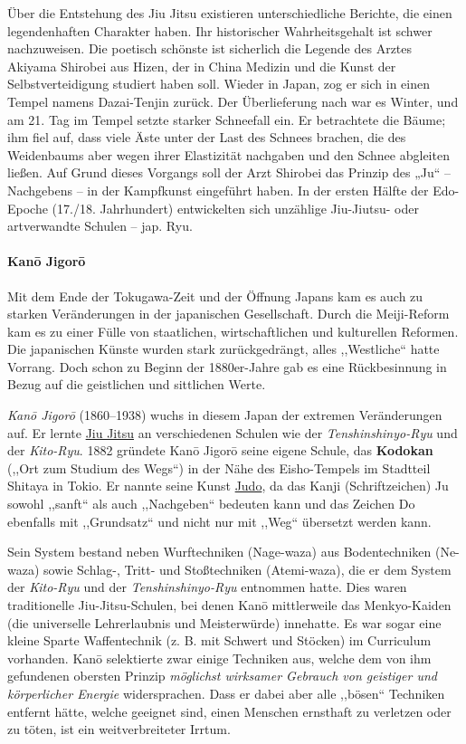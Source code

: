 \documentclass[justified, a4paper, notitlepage, captions=tableheading, nobib]{tufte-handout}
\begin{document}
Über die Entstehung des \label{orgb1f4d96}Jiu Jitsu existieren unterschiedliche Berichte, die einen legendenhaften Charakter haben. Ihr historischer Wahrheitsgehalt ist schwer nachzuweisen. Die poetisch schönste ist sicherlich die Legende des Arztes Akiyama Shirobei aus Hizen, der in China Medizin und die Kunst der Selbstverteidigung studiert haben soll. Wieder in Japan, zog er sich in einen Tempel namens Dazai-Tenjin zurück. Der Überlieferung nach war es Winter, und am 21. Tag im Tempel setzte starker Schneefall ein. Er betrachtete die Bäume; ihm fiel auf, dass viele Äste unter der Last des Schnees brachen, die des Weidenbaums aber wegen ihrer Elastizität nachgaben und den Schnee abgleiten ließen. Auf Grund dieses Vorgangs soll der Arzt Shirobei das Prinzip des „Ju“ – Nachgebens – in der Kampfkunst eingeführt haben. In der ersten Hälfte der Edo-Epoche (17./18. Jahrhundert) entwickelten sich unzählige Jiu-Jiutsu- oder artverwandte Schulen – jap. Ryu.

\paragraph{Kanō Jigorō}
\label{sec:org6c92adc}
Mit dem Ende der Tokugawa-Zeit und der Öffnung Japans kam es auch zu starken Veränderungen in der japanischen Gesellschaft. Durch die Meiji-Reform kam es zu einer Fülle von staatlichen, wirtschaftlichen und kulturellen Reformen. Die japanischen Künste wurden stark zurückgedrängt, alles ,,Westliche`` hatte Vorrang. Doch schon zu Beginn der 1880er-Jahre gab es eine Rückbesinnung in Bezug auf die geistlichen und sittlichen Werte.

\emph{Kanō Jigorō} (1860–1938) wuchs in diesem Japan der extremen Veränderungen auf. Er lernte \hyperref[orgb1f4d96]{Jiu Jitsu} an verschiedenen Schulen wie der \emph{Tenshinshinyo-Ryu} und der \emph{Kito-Ryu}. 1882 gründete Kanō Jigorō seine eigene Schule, das \textbf{Kodokan} (,,Ort zum Studium des Wegs``) in der Nähe des Eisho-Tempels im Stadtteil Shitaya in Tokio. Er nannte seine Kunst \hyperref[org60aba15]{Judo}, da das Kanji (Schriftzeichen) Ju sowohl ,,sanft`` als auch ,,Nachgeben`` bedeuten kann und das Zeichen Do ebenfalls mit ,,Grundsatz`` und nicht nur mit ,,Weg`` übersetzt werden kann.

Sein System bestand neben Wurftechniken (Nage-waza) aus Bodentechniken (Ne-waza) sowie Schlag-, Tritt- und Stoßtechniken (Atemi-waza), die er dem System der \emph{Kito-Ryu} und der \emph{Tenshinshinyo-Ryu} entnommen hatte. Dies waren traditionelle Jiu-Jitsu-Schulen, bei denen Kanō mittlerweile das Menkyo-Kaiden (die universelle Lehrerlaubnis und Meisterwürde) innehatte. Es war sogar eine kleine Sparte Waffentechnik (z. B. mit Schwert und Stöcken) im Curriculum vorhanden. Kanō selektierte zwar einige Techniken aus, welche dem von ihm gefundenen obersten Prinzip \emph{möglichst wirksamer Gebrauch von geistiger und körperlicher Energie} widersprachen. Dass er dabei aber alle ,,bösen`` Techniken entfernt hätte, welche geeignet sind, einen Menschen ernsthaft zu verletzen oder zu töten, ist ein weitverbreiteter Irrtum.
\end{document}
